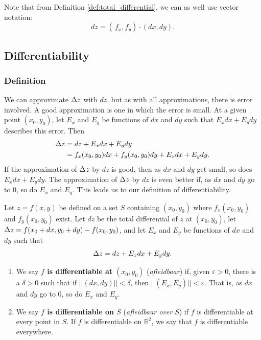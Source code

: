 Note that from  Definition \ref{def:total_differential}, we can as well use vector notation: $$dz = \left(\, f_x,f_y\right)\cdot\left( dx,dy\right).$$

\subsection{Differentiability}
\subsubsection{Definition}
We can approximate $\Delta z$ with $dz$, but as with all approximations, there is error involved. A good approximation is one in which the error is small. At a given point $(x_0,y_0)$, let $E_x$ and $E_y$ be functions of $dx$ and $dy$ such that $E_xdx+E_ydy$ describes this error. Then
\begin{align*}
\Delta z &= dz + E_xdx+ E_ydy \\
		&= f_x(x_0,y_0)dx+f_y(x_0,y_0)dy + E_xdx+E_ydy.
\end{align*}
If the approximation of $\Delta z$ by $dz$ is good, then as $dx$ and $dy$ get small,  so does $E_xdx+E_ydy$. The approximation of $\Delta z$ by $dz$ is even better if, as $dx$ and $dy$ go to 0, so do $E_x$ and $E_y$. This leads us to our definition of differentiability.

\begin{definition}\label{def:multi_differentiability}
Let $z=f(x,y)$ be defined on a set $S$ containing $(x_0,y_0)$ where $f_x(x_0,y_0)$ and $f_y(x_0,y_0)$ exist. Let $dz$ be the total differential of $z$ at $(x_0,y_0)$, let $\Delta z = f(x_0+dx,y_0+dy) - f(x_0,y_0)$, and let $E_x$ and $E_y$ be functions of $dx$ and $dy$  such that 
$$\Delta z = dz + E_xdx + E_ydy.$$
\begin{enumerate}
	\item We say \textbf{$f$ is differentiable at $(x_0,y_0)$} (\textit{afleidbaar}) if, given $\varepsilon >0$, there is a $\delta >0$ such that if $||\left(dx,dy\right)|| < \delta$, then $||\left(E_x,E_y\right)|| < \varepsilon$. That is, as $dx$ and $dy$ go to 0, so do $E_x$ and $E_y$.
	\item	We say \textbf{$f$ is differentiable on $S$} (\textit{afleidbaar over $S$}) if $f$ is differentiable at every point in $S$. If $f$ is differentiable on $\mathbb{R}^2$, we say that $f$ is differentiable everywhere.
\end{enumerate}
\end{definition}


